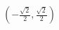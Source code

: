 \documentclass[preview]{standalone}
\begin{document}
\begin{align*}
\left(-\frac{\sqrt{2}}{2}, \frac{\sqrt{2}}{2}\right)
\end{align*}
\end{document}
